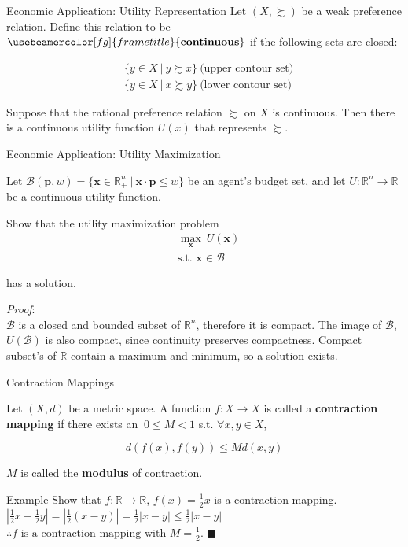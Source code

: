 \documentclass[11pt, xcolor={dvipsnames}, hyperref={colorlinks, allcolors=Blue}]{beamer}
\newcommand\bc[1]{{\usebeamercolor[fg]{frametitle} {\textbf{#1}}}} %
\newcommand{\R}{\mathbb{R}}
\newcommand{\halmos}{\hfill$\blacksquare$}
\begin{document}
\begin{frame}{Economic Application: Utility Representation}
Let $(X, \succsim)$ be a weak preference relation. Define this relation to be $\bc{continuous}$ if the following sets are closed:

\begin{align*}
&\{y \in X \ | \ y \succsim x\} \ \text{(upper contour set)}\\
&\{y \in X \ | \ x \succsim y\}\ \text{(lower contour set)}
\end{align*}


\begin{theorem}[MWG 3.C.1]
Suppose that the rational preference relation $\succsim$ on $X$ is continuous. Then there is a continuous utility function $U(x)$ that represents $\succsim$.
\end{theorem}


\end{frame}

\begin{frame}{Economic Application: Utility Maximization}

Let $\mathcal{B}(\mathbf{p}, w) = \{\mathbf{x} \in \R^{n}_{+} \ | \ \mathbf{x}\cdot \mathbf{p} \leq w\}$ be an agent's budget set, and let $U:\R^{n}\to\R$ be a continuous utility function.\bigskip

Show that the utility maximization problem
\begin{align*}
&\underset{\mathbf{x}}{\max} \ U(\mathbf{x}) \\
& \text{s.t. } \mathbf{x} \in \mathcal{B}
\end{align*}

has a solution. \bigskip

\textit{Proof}:\\
$\mathcal{B}$ is a closed and bounded subset of $\R^{n}$, therefore it is compact. The image of $\mathcal{B}$, $U(\mathcal{B})$ is also compact, since continuity preserves compactness. Compact subset's of $\R$ contain a maximum and minimum, so a solution exists.

\end{frame}

\begin{frame}{Contraction Mappings}

Let $(X, d)$ be a metric space. A function $f:X\to X$ is called a \bc{contraction mapping} if there exists an $ \  0\leq M < 1$ s.t. $\forall x, y \in X$, 

$$d\left( f(x), f(y) \right) \leq M d(x,y)$$

$M$ is called the \bc{modulus} of contraction.\bigskip

\begin{block}{Example}
Show that $f:\R\to \R$, $f(x) = \frac{1}{2}x$ is a contraction mapping.\\

$|\frac{1}{2}x - \frac{1}{2}y| = |\frac{1}{2}(x-y)| = \frac{1}{2}|x - y| \leq \frac{1}{2}|x - y|$\\

$\therefore f \text{ is a contraction mapping with } M=\frac{1}{2}$.
\halmos
\end{block}
\end{frame}
\end{document}
